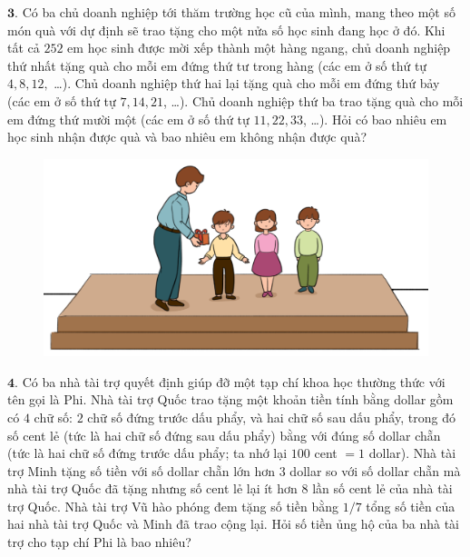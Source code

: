 \begin{multicols}{2}
\begin{figure}[H]
		\vspace*{-5pt}
	\end{figure}
	$\pmb{3.}$ 	Có ba chủ doanh nghiệp tới thăm trường học cũ của mình, mang theo một số món quà với dự định sẽ trao tặng cho một nửa số học sinh đang học ở đó. Khi tất cả $252$ em học sinh được mời xếp thành một hàng ngang, chủ doanh nghiệp thứ nhất tặng quà cho mỗi em đứng thứ tư trong hàng (các em ở số thứ tự $4,8,12,$ \ldots). Chủ doanh nghiệp thứ hai lại tặng quà cho mỗi em đứng thứ bảy (các em ở số thứ tự $7,14,21$, \ldots). Chủ doanh nghiệp thứ ba trao tặng quà cho mỗi em đứng thứ mười một (các em ở số thứ tự $11,22,33$, \ldots). Hỏi có bao nhiêu em học sinh nhận được quà và bao nhiêu em không nhận được quà?
	\begin{figure}[H]
		\centering
		\vspace*{-5pt}
		\captionsetup{labelformat= empty, justification=centering}
		\includegraphics[width=1\linewidth]{Hinh3}
		\vspace*{-15pt}
	\end{figure}
	$\pmb{4.}$ 	Có ba nhà tài trợ quyết định giúp đỡ một tạp chí khoa học thường thức với tên gọi là Phi. Nhà tài trợ Quốc trao tặng một khoản tiền tính bằng dollar gồm có $4$ chữ số: $2$ chữ số đứng trước dấu phẩy, và hai chữ số sau dấu phẩy, trong đó số cent lẻ (tức là hai chữ số đứng sau dấu phẩy) bằng với đúng số dollar chẵn (tức là hai chữ số đứng trước dấu phẩy; ta nhớ lại $100$ cent $= 1$ dollar). Nhà tài trợ Minh tặng số tiền với số dollar chẵn lớn hơn $3$ dollar so với số dollar chẵn mà nhà tài trợ Quốc đã tặng nhưng số cent lẻ lại ít hơn $8$ lần số cent lẻ của nhà tài trợ Quốc. Nhà tài trợ Vũ hào phóng đem tặng số tiền bằng $1/7$ tổng số tiền của hai nhà tài trợ Quốc và Minh đã trao cộng lại. Hỏi số tiền ủng hộ của ba nhà tài trợ cho tạp chí Phi là bao nhiêu?
	\begin{figure}[H]
		\centering

\end{figure}
\end{multicols}
